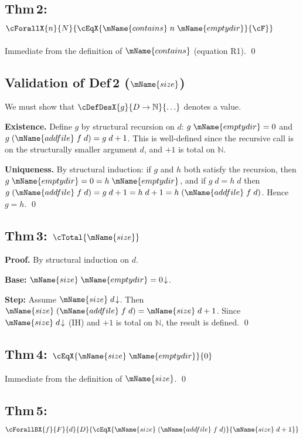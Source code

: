\documentclass[11pt]{article}
\begin{document}
\subsection{Thm\,2:
  $\cForallX{n}{N}{\cEqX{\mName{contains}\;n\;\mName{emptydir}}{\cF}}$}

Immediate from the definition of $\mName{contains}$ (equation R1).
\qed

\subsection{Validation of Def\,2 ($\mName{size}$)}

We must show that $\cDefDesX{g}{D \to \mathbb{N}}{\ldots}$ denotes
a value.

\textbf{Existence.}
Define $g$ by structural recursion on $d$:
$g\;\mName{emptydir} = 0$ and
$g\;(\mName{addfile}\;f\;d) = g\;d + 1$.
This is well-defined since the recursive call is on the
structurally smaller argument $d$, and $+ 1$ is total on
$\mathbb{N}$.

\textbf{Uniqueness.}
By structural induction: if $g$ and $h$ both satisfy the
recursion, then $g\;\mName{emptydir} = 0 = h\;\mName{emptydir}$,
and if $g\;d = h\;d$ then
$g\;(\mName{addfile}\;f\;d) = g\;d + 1 = h\;d + 1
= h\;(\mName{addfile}\;f\;d)$.
Hence $g = h$. \qed

\subsection{Thm\,3: $\cTotal{\mName{size}}$}

\textbf{Proof.}
By structural induction on $d$.

\textbf{Base:} $\mName{size}\;\mName{emptydir} = 0\!\downarrow$.

\textbf{Step:} Assume $\mName{size}\;d\!\downarrow$.  Then
$\mName{size}\;(\mName{addfile}\;f\;d) = \mName{size}\;d + 1$.
Since $\mName{size}\;d\!\downarrow$ (IH) and $+ 1$ is total on
$\mathbb{N}$, the result is defined. \qed

\subsection{Thm\,4:
  $\cEqX{\mName{size}\;\mName{emptydir}}{0}$}

Immediate from the definition of $\mName{size}$. \qed

\subsection{Thm\,5:
  $\cForallBX{f}{F}{d}{D}{
    \cEqX{\mName{size}\;(\mName{addfile}\;f\;d)}{\mName{size}\;d + 1}}$}
\end{document}
